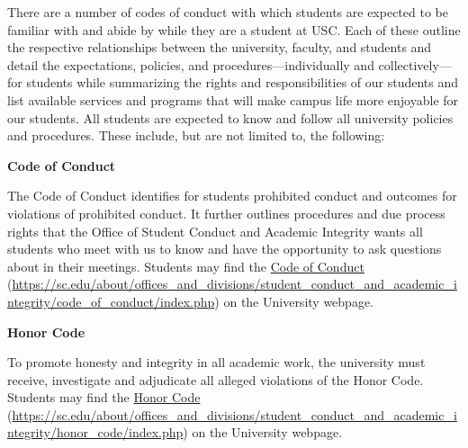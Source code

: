 \documentclass[11pt,letterpaper]{article}
\begin{document}
\newpage






There are a number of codes of conduct with which students are expected to be familiar with and abide by while they are a student at USC. Each of these outline the respective relationships between the university, faculty, and students and detail the expectations, policies, and procedures---individually and collectively---for students while summarizing the rights and responsibilities of our students and list available services and programs that will make campus life more enjoyable for our students. All students are expected to know and follow all university policies and procedures. These include, but are not limited to, the following: \pspace

{\bfseries Code of Conduct} \par
The Code of Conduct identifies for students prohibited conduct and outcomes for violations of prohibited conduct. It further outlines procedures and due process rights that the Office of Student Conduct and Academic Integrity wants all students who meet with us to know and have the opportunity to ask questions about in their meetings. Students may find the \href{https://sc.edu/about/offices\_and\_divisions/student\_conduct\_and\_academic\_integrity/code\_of\_conduct/index.php}{Code of Conduct} (\url{https://sc.edu/about/offices\_and\_divisions/student\_conduct\_and\_academic\_integrity/code\_of\_conduct/index.php}) on the University webpage. \pspace

{\bfseries Honor Code} \par
To promote honesty and integrity in all academic work, the university must receive, investigate and adjudicate all alleged violations of the Honor Code. Students may find the \href{https://sc.edu/about/offices\_and\_divisions/student\_conduct\_and\_academic\_integrity/honor\_code/index.php}{Honor Code} (\url{https://sc.edu/about/offices\_and\_divisions/student\_conduct\_and\_academic\_integrity/honor\_code/index.php}) on the University webpage. \pspace
\end{document}

